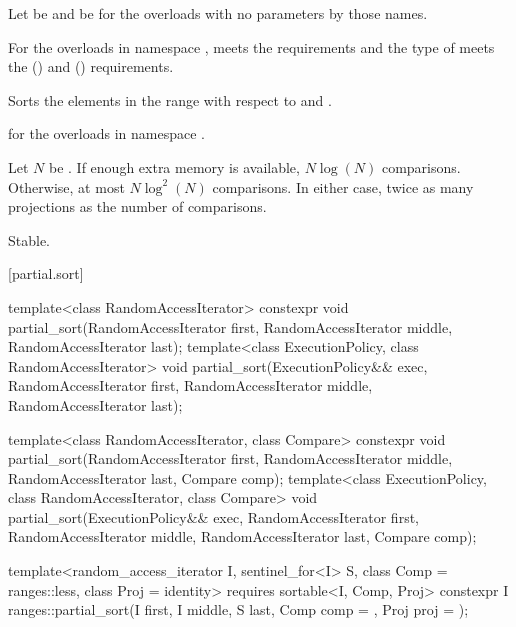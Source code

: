 \begin{itemdescr}
\pnum
Let  be 
and  be 
for the overloads with no parameters by those names.

\pnum
\expects
For the overloads in namespace ,
 meets
the  requirements and
the type of  meets
the  () and
 () requirements.

\pnum
\effects
Sorts the elements in the range 
with respect to  and .

\pnum
\returns
{} for the overloads in namespace .

\pnum
\complexity
Let $N$ be .
If enough extra memory is available, $N \log(N)$ comparisons.
Otherwise, at most $N \log^2(N)$ comparisons.
In either case, twice as many projections as the number of comparisons.

\pnum
\remarks
Stable.
\end{itemdescr}

[partial.sort]{}

%
\begin{itemdecl}
template<class RandomAccessIterator>
  constexpr void partial_sort(RandomAccessIterator first,
                              RandomAccessIterator middle,
                              RandomAccessIterator last);
template<class ExecutionPolicy, class RandomAccessIterator>
  void partial_sort(ExecutionPolicy&& exec,
                    RandomAccessIterator first,
                    RandomAccessIterator middle,
                    RandomAccessIterator last);

template<class RandomAccessIterator, class Compare>
  constexpr void partial_sort(RandomAccessIterator first,
                              RandomAccessIterator middle,
                              RandomAccessIterator last,
                              Compare comp);
template<class ExecutionPolicy, class RandomAccessIterator, class Compare>
  void partial_sort(ExecutionPolicy&& exec,
                    RandomAccessIterator first,
                    RandomAccessIterator middle,
                    RandomAccessIterator last,
                    Compare comp);

template<random_access_iterator I, sentinel_for<I> S, class Comp = ranges::less,
         class Proj = identity>
  requires sortable<I, Comp, Proj>
  constexpr I
    ranges::partial_sort(I first, I middle, S last, Comp comp = {}, Proj proj = {});
\end{itemdecl}

